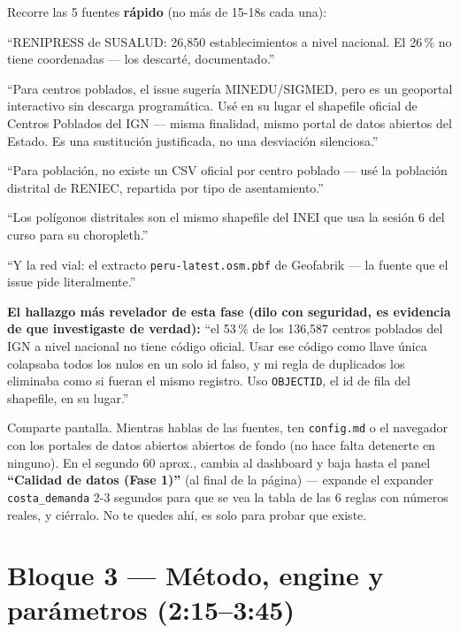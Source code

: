 \documentclass[11pt]{article}
\begin{document}
\begin{decirbox}
Recorre las 5 fuentes \textbf{rápido} (no más de 15-18s cada una):

``RENIPRESS de SUSALUD: 26,850 establecimientos a nivel nacional. El 26\,\%
no tiene coordenadas --- los descarté, documentado.''

``Para centros poblados, el issue sugería MINEDU/SIGMED, pero es un
geoportal interactivo sin descarga programática. Usé en su lugar el
shapefile oficial de Centros Poblados del IGN --- misma finalidad, mismo
portal de datos abiertos del Estado. Es una sustitución justificada, no
una desviación silenciosa.''

``Para población, no existe un CSV oficial por centro poblado --- usé la
población distrital de RENIEC, repartida por tipo de asentamiento.''

``Los polígonos distritales son el mismo shapefile del INEI que usa la
sesión 6 del curso para su choropleth.''

``Y la red vial: el extracto \texttt{peru-latest.osm.pbf} de Geofabrik ---
la fuente que el issue pide literalmente.''

\textbf{El hallazgo más revelador de esta fase (dilo con seguridad, es
evidencia de que investigaste de verdad):} ``el 53\,\% de los 136,587
centros poblados del IGN a nivel nacional no tiene código oficial. Usar
ese código como llave única colapsaba todos los nulos en un solo id
falso, y mi regla de duplicados los eliminaba como si fueran el mismo
registro. Uso \texttt{OBJECTID}, el id de fila del shapefile, en su
lugar.''
\end{decirbox}

\begin{hacerbox}
Comparte pantalla. Mientras hablas de las fuentes, ten \texttt{config.md}
o el navegador con los portales de datos abiertos abiertos de fondo (no
hace falta detenerte en ninguno). En el segundo 60 aprox., cambia al
dashboard y baja hasta el panel \textbf{``Calidad de datos (Fase 1)''}
(al final de la página) --- expande el expander \texttt{costa\_demanda}
2-3 segundos para que se vea la tabla de las 6 reglas con números reales,
y ciérralo. No te quedes ahí, es solo para probar que existe.
\end{hacerbox}

\section{Bloque 3 --- Método, engine y parámetros (2:15--3:45)}
\end{document}
